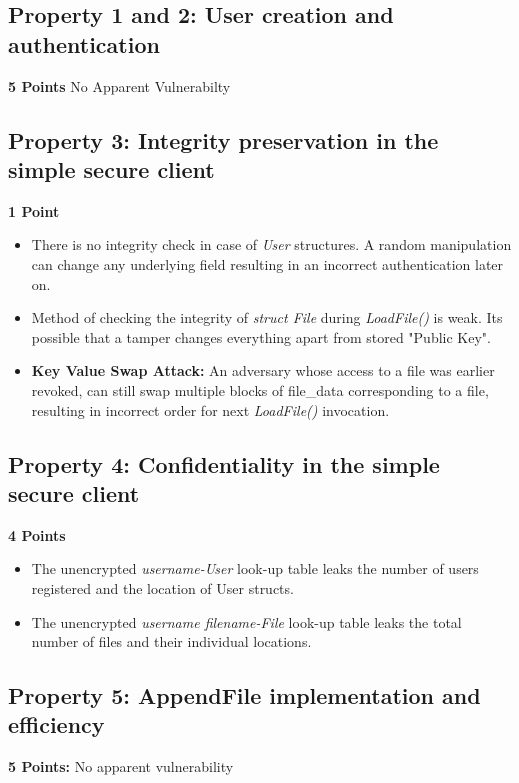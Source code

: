\documentclass[12pt]{article}
\begin{document}
\subsection*{Property 1 and 2: User creation and authentication}
\textbf{5 Points} No Apparent Vulnerabilty
\vspace{-0.2cm}


\subsection*{Property 3: Integrity preservation in the simple secure client}
\textbf{1 Point}
\vspace{-0.2cm}

\begin{itemize}[wide=0pt, noitemsep]
	\itemsep0em
	\item There is no integrity check in case of \textit{User} structures. A random manipulation can change any underlying field resulting in an incorrect authentication later on.
	\item Method of checking the integrity of \textit{struct File} during \textit{LoadFile()} is weak. Its possible that a tamper changes everything apart from stored "Public Key".
	\item \textbf{Key Value Swap Attack:} An adversary whose access to a file was earlier revoked, can still swap multiple blocks of file\_data corresponding to a file, resulting in incorrect order for next \textit{LoadFile()} invocation.
\end{itemize}

\subsection*{Property 4: Confidentiality in the simple secure client}
\textbf{4 Points}
\vspace{-0.2cm}

\begin{itemize}[wide=0pt, noitemsep]
	\itemsep0em
		\item The unencrypted \textit{username-User} look-up table leaks the number of users registered and the location of User structs.
	\item The unencrypted \textit{username filename-File} look-up table leaks the total number of files and their individual locations.
\end{itemize}

\subsection*{Property 5: AppendFile implementation and efficiency}
\textbf{5 Points:} No apparent vulnerability
\vspace{-0.2cm}
\end{document}
